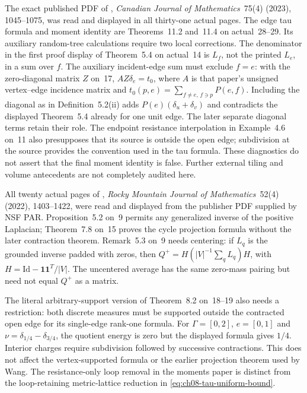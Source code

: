 The exact published PDF of
\cite{dJS23TropicalMomentsPublished}, \emph{Canadian Journal of
Mathematics}~75(4) (2023), 1045--1075, was read and displayed in
all thirty-one actual pages. The edge tau formula and moment
identity are Theorems~11.2 and~11.4 on actual~28--29. Its auxiliary
random-tree calculations require two local corrections. The
denominator in the first proof display of Theorem~5.4 on actual~14
is $L_f$, not the printed $L_e$, in a sum over $f$. The auxiliary
incident-edge sum must exclude $f=e$: with the zero-diagonal
matrix $Z$ on~17, $AZ\delta_e=t_0$, where $A$ is that paper's
unsigned vertex--edge incidence matrix and
$t_0(p,e)=\sum_{f\ne e,\,f\ni p}P(e,f)$. Including the diagonal
as in Definition~5.2(ii) adds $P(e)(\delta_u+\delta_v)$ and
contradicts the displayed Theorem~5.4 already for one unit edge.
The later separate diagonal terms retain their role. The endpoint
resistance interpolation in Example~4.6 on~11 also presupposes
that its source is outside the open edge; subdivision at the
source provides the convention used in the tau formula.
These diagnostics do not assert that the final moment identity
is false. Further external tiling and volume antecedents are
not completely audited here.

All twenty actual pages of
\cite{dJS22RayleighPublished}, \emph{Rocky Mountain Journal of
Mathematics}~52(4) (2022), 1403--1422, were read and displayed
from the publisher PDF supplied by NSF PAR. Proposition~5.2
on~9 permits any generalized inverse of the positive Laplacian;
Theorem~7.8 on~15 proves the cycle projection formula without
the later contraction theorem. Remark~5.3 on~9 needs centering:
if $L_q$ is the grounded inverse padded with zeros, then
$Q^+=H(|V|^{-1}\sum_q L_q)H$, with
$H=\mathrm{Id}-\mathbf1\mathbf1^T/|V|$. The uncentered average
has the same zero-mass pairing but need not equal $Q^+$ as a matrix.

The literal arbitrary-support version of Theorem~8.2 on~18--19
also needs a restriction: both discrete measures must be supported
outside the contracted open edge for its single-edge rank-one
formula. For $\Gamma=[0,2]$, $e=[0,1]$ and
$\nu=\delta_{1/4}-\delta_{3/4}$, the quotient energy is zero
but the displayed formula gives $1/4$. Interior charges require
subdivision followed by successive contractions. This does not
affect the vertex-supported formula or the earlier projection
theorem used by Wang. The resistance-only loop removal in the
moments paper is distinct from the loop-retaining metric-lattice
reduction in \eqref{eq:ch08-tau-uniform-bound}.


